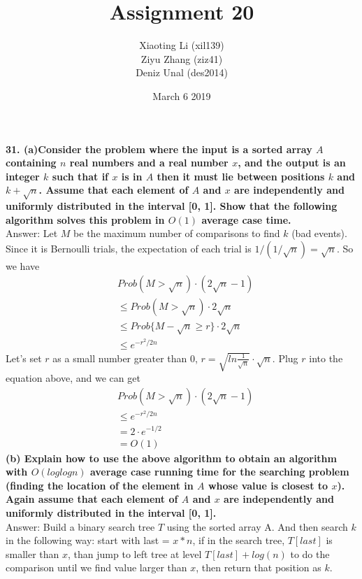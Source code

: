 \documentclass{article}
\title{Assignment 20}
\author{Xiaoting Li (xil139) \\
Ziyu Zhang (ziz41) \\
Deniz Unal (des2014)}
\date{March 6 2019}
\begin{document}
\maketitle

\noindent
\textbf{31. (a)Consider the problem where the input is a sorted array $A$ containing $n$ real numbers and a real number $x$, and the output is an integer $k$ such that if $x$ is in $A$ then it must lie between positions $k$ and $k + \sqrt{n}$. Assume that each element of $A$ and $x$ are independently and uniformly distributed in the interval [0, 1]. Show that the following algorithm solves this problem in $O(1)$ average case time.} \\ \newline 
Answer: Let $M$ be the maximum number of comparisons to find $k$ (bad events). Since it is Bernoulli trials, the expectation of each trial is $1/(1/\sqrt{n}) = \sqrt{n}$. So we have
\begin{align*}
&Prob(M > \sqrt{n}) \cdot (2\sqrt{n} - 1)\\
&\leq Prob(M > \sqrt{n}) \cdot 2\sqrt{n}\\
&\leq Prob\{M - \sqrt{n}\geq r\}\cdot 2\sqrt{n}\\
&\leq e^{-r^2/2n}
\end{align*}
Let's set $r$ as a small number greater than 0, $r = \sqrt{ln\frac{1}{\sqrt{n}}}\cdot \sqrt{n}$. Plug $r$ into the equation above, and we can get 
\begin{align*}
&Prob(M > \sqrt{n}) \cdot (2\sqrt{n} - 1)\\
&\leq e^{-r^2/2n}\\
&=2\cdot e^{-1/2}\\
&= O(1)
\end{align*}\newline
\textbf{(b) Explain how to use the above algorithm to obtain an algorithm with $O(log log n)$ average case running time for the searching problem (finding the location of the element in $A$ whose value is closest to $x$). Again assume that each element of $A$ and $x$ are independently and uniformly distributed in the interval [0, 1].}\\ \newline
Answer: Build a binary search tree $T$ using the sorted array A. And then search $k$ in the following way: start with last = $x*n$, if in the search tree, $T[last]$ is smaller than $x$, than jump to left tree at level $T[last] + log(n)$ to do the comparison until we find value larger than $x$, then return that position as $k$. 
\end{document}
